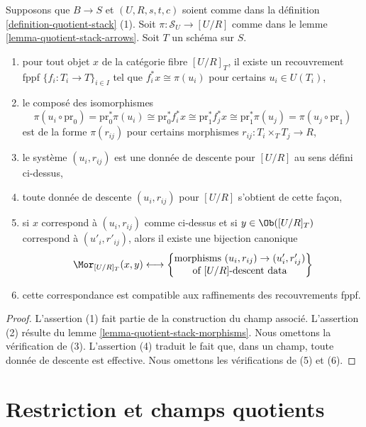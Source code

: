 \begin{lemma}
\label{lemma-quotient-stack-objects}
Supposons que $B \to S$ et $(U, R, s, t, c)$ soient comme dans la définition \ref{definition-quotient-stack} (1). Soit $\pi : \mathcal{S}_U \to [U/R]$ comme dans le lemme \ref{lemma-quotient-stack-arrows}. Soit $T$ un schéma sur $S$.
\begin{enumerate}
\item pour tout objet $x$ de la catégorie fibre $[U/R]_T$, il existe un recouvrement fppf $\{f_i : T_i \to T\}_{i \in I}$ tel que $f_i^*x \cong \pi(u_i)$ pour certains $u_i \in U(T_i)$,
\item le composé des isomorphismes
$$
\pi(u_i \circ \text{pr}_0)
=
\text{pr}_0^*\pi(u_i)
\cong
\text{pr}_0^*f_i^*x
\cong
\text{pr}_1^*f_j^*x
\cong
\text{pr}_1^*\pi(u_j)
=
\pi(u_j \circ \text{pr}_1)
$$
est de la forme $\pi(r_{ij})$ pour certains morphismes $r_{ij} : T_i \times_T T_j \to R$,
\item le système $(u_i, r_{ij})$ est une donnée de descente pour $[U/R]$ au sens défini ci-dessus,
\item toute donnée de descente $(u_i, r_{ij})$ pour $[U/R]$ s'obtient de cette façon,
\item si $x$ correspond à $(u_i, r_{ij})$ comme ci-dessus et si $y \in \Ob([U/R]_T)$ correspond à $(u'_i, r'_{ij})$, alors il existe une bijection canonique
$$
\Mor_{[U/R]_T}(x, y)
\longleftrightarrow
\left\{
\begin{matrix}
\text{morphisms }(u_i, r_{ij}) \to (u'_i, r'_{ij})\\
\text{of }[U/R]\text{-descent data}
\end{matrix}
\right\}
$$
\item cette correspondance est compatible aux raffinements des recouvrements fppf.
\end{enumerate}
\end{lemma}

\begin{proof}
L'assertion (1) fait partie de la construction du champ associé. L'assertion (2) résulte du lemme \ref{lemma-quotient-stack-morphisms}. Nous omettons la vérification de (3). L'assertion (4) traduit le fait que, dans un champ, toute donnée de descente est effective. Nous omettons les vérifications de (5) et (6).
\end{proof}








\section{Restriction et champs quotients}
\label{section-quotient-stack-restrict}

